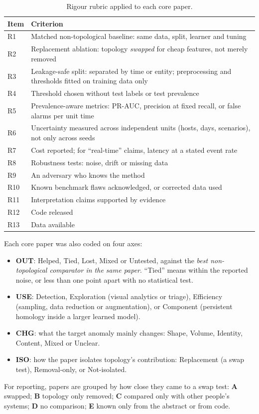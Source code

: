 \begin{table}[ht]
\centering\small
\caption{Rigour rubric applied to each core paper.}
\label{tab:rubric}
\begin{tabularx}{\linewidth}{@{}lY@{}}
\toprule
Item & Criterion \\
\midrule
R1 & Matched non-topological baseline: same data, split, learner and tuning \\
R2 & Replacement ablation: topology \emph{swapped} for cheap features, not merely removed \\
R3 & Leakage-safe split: separated by time or entity; preprocessing and thresholds fitted on training data only \\
R4 & Threshold chosen without test labels or test prevalence \\
R5 & Prevalence-aware metrics: PR-AUC, precision at fixed recall, or false alarms per unit time \\
R6 & Uncertainty measured across independent units (hosts, days, scenarios), not only across seeds \\
R7 & Cost reported; for ``real-time'' claims, latency at a stated event rate \\
R8 & Robustness tests: noise, drift or missing data \\
R9 & An adversary who knows the method \\
R10 & Known benchmark flaws acknowledged, or corrected data used \\
R11 & Interpretation claims supported by evidence \\
R12 & Code released \\
R13 & Data available \\
\bottomrule
\end{tabularx}
\end{table}

Each core paper was also coded on four axes:
\begin{itemize}
  \item \textbf{OUT}: Helped, Tied, Lost, Mixed or Untested, against the \emph{best non-topological comparator in the same paper}. ``Tied'' means within the reported noise, or less than one point apart with no statistical test.
  \item \textbf{USE}: Detection, Exploration (visual analytics or triage), Efficiency (sampling, data reduction or augmentation), or Component (persistent homology inside a larger learned model).
  \item \textbf{CHG}: what the target anomaly mainly changes: Shape, Volume, Identity, Content, Mixed or Unclear.
  \item \textbf{ISO}: how the paper isolates topology's contribution: Replacement (a swap test), Removal-only, or Not-isolated.
\end{itemize}
For reporting, papers are grouped by how close they came to a swap test: \textbf{A} swapped; \textbf{B} topology only removed; \textbf{C} compared only with other people's systems; \textbf{D} no comparison; \textbf{E} known only from the abstract or from code.

